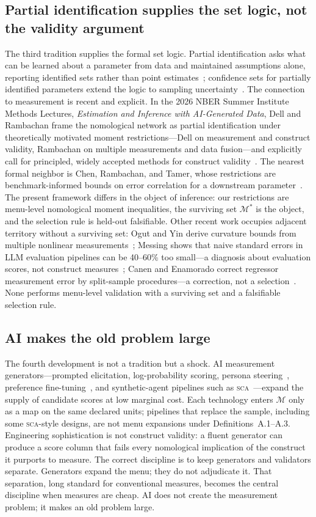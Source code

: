 \documentclass[10pt,letterpaper]{article}
\newcommand{\SCA}{\textsc{sca}}
\newcommand{\M}{\ensuremath{\mathcal{M}}}
\begin{document}
\subsection{Partial identification supplies the set logic, not the validity argument}
The third tradition supplies the formal set logic.
Partial identification asks what can be learned about a parameter from data and maintained assumptions alone, reporting identified sets rather than point estimates~\cite{manski2003,molinari2020}; confidence sets for partially identified parameters extend the logic to sampling uncertainty~\cite{imbensmanski2004,stoye2009}.
The connection to measurement is recent and explicit.
In the 2026 NBER Summer Institute Methods Lectures, \emph{Estimation and Inference with AI-Generated Data}, Dell and Rambachan frame the nomological network as partial identification under theoretically motivated moment restrictions---Dell on measurement and construct validity, Rambachan on multiple measurements and data fusion---and explicitly call for principled, widely accepted methods for construct validity~\cite{dellrambachan2026}.
The nearest formal neighbor is Chen, Rambachan, and Tamer, whose restrictions are benchmark-informed bounds on error correlation for a downstream parameter~\cite{chenrttamer2026}.
The present framework differs in the object of inference: our restrictions are menu-level nomological moment inequalities, the surviving set $\M^*$ is the object, and the selection rule is held-out falsifiable.
Other recent work occupies adjacent territory without a surviving set: Ogut and Yin derive curvature bounds from multiple nonlinear measurements~\cite{ogutyin2026}; Messing shows that naive standard errors in LLM evaluation pipelines can be 40--60\% too small---a diagnosis about evaluation scores, not construct measures~\cite{messing2026}; Canen and Enamorado correct regressor measurement error by split-sample procedures---a correction, not a selection~\cite{canenenamorado2026}.
None performs menu-level validation with a surviving set and a falsifiable selection rule.

\subsection{AI makes the old problem large}
The fourth development is not a tradition but a shock.
AI measurement generators---prompted elicitation, log-probability scoring, persona steering~\cite{disca2026}, preference fine-tuning~\cite{plural2026,palms2026}, and synthetic-agent pipelines such as \SCA{}~\cite{capra2025}---expand the supply of candidate scores at low marginal cost.
Each technology enters $\M$ only as a map on the same declared units; pipelines that replace the sample, including some \SCA{}-style designs, are not menu expansions under Definitions~A.1--A.3.
Engineering sophistication is not construct validity: a fluent generator can produce a score column that fails every nomological implication of the construct it purports to measure.
The correct discipline is to keep generators and validators separate.
Generators expand the menu; they do not adjudicate it.
That separation, long standard for conventional measures, becomes the central discipline when measures are cheap.
AI does not create the measurement problem; it makes an old problem large.
\end{document}
